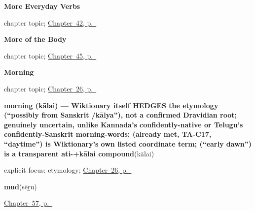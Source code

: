 \noindent\begin{minipage}[t]{\linewidth}
\raggedright
\textbf{More Everyday Verbs}\par
\footnotesize chapter topic; \hyperref[ch:ta-more-verbs]{Chapter~42, p.~\pageref*{ch:ta-more-verbs}}
\end{minipage}\par\smallskip

\noindent\begin{minipage}[t]{\linewidth}
\raggedright
\textbf{More of the Body}\par
\footnotesize chapter topic; \hyperref[ch:ta-body-more]{Chapter~45, p.~\pageref*{ch:ta-body-more}}
\end{minipage}\par\smallskip

\noindent\begin{minipage}[t]{\linewidth}
\raggedright
\textbf{Morning}\par
\footnotesize chapter topic; \hyperref[ch:ta-morning]{Chapter~26, p.~\pageref*{ch:ta-morning}}
\end{minipage}\par\smallskip

\noindent\begin{minipage}[t]{\linewidth}
\raggedright
\textbf{morning (kālai) — Wiktionary itself HEDGES the etymology (\textquotedblleft{}possibly from Sanskrit /kālya\textquotedblright{}), not a confirmed Dravidian root; genuinely uncertain, unlike Kannada's confidently-native or Telugu's confidently-Sanskrit morning-words;  (already met, TA-C17, \textquotedblleft{}daytime\textquotedblright{}) is Wiktionary's own listed coordinate term;  (\textquotedblleft{}early dawn\textquotedblright{}) is a transparent ati-+kālai compound}\enspace\emph{}\enspace(kālai)\par
\footnotesize explicit focus: etymology; \hyperref[ch:ta-morning]{Chapter~26, p.~\pageref*{ch:ta-morning}}
\end{minipage}\par\smallskip

\noindent\begin{minipage}[t]{\linewidth}
\raggedright
\textbf{mud}\enspace\emph{}\enspace(sēṟu)\par
\footnotesize \hyperref[ch:ta-wind-and-fire]{Chapter~57, p.~\pageref*{ch:ta-wind-and-fire}}
\end{minipage}\par\smallskip

